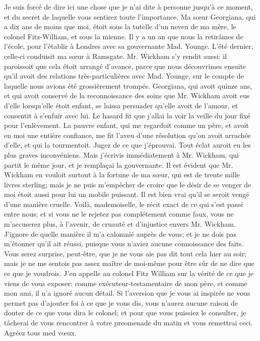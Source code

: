 Je suis forcé de dire ici une chose que je n'ai dite à personne jusqu'à ce moment,\setcounter{page}{97} et du secret de laquelle vous sentirez toute l'importance. Ma sœur Georgiana, qui a dix ans de moins que moi, étoit sous la tutelle d'un neveu de ma mère, le colonel Fitz-William, et sous la mienne. Il y a un an que nous la retirâmes de l'école, pour l'établir à Londres avec sa gouvernante Mad. Younge. L'été dernier, celle-ci conduisit ma sœur à Ramsgate. Mr. Wickham s'y rendit aussi: il paroissoit que cela étoit arrangé d'avance, parce que nous découvrimes ensuite qu'il avoit des relations très-particulières avec Mad. Younge, sur le compte de laquelle nous avions été grossièrement trompés. Georgiana, qui avoit quinze ans, et qui avoit conservé de la reconnoissance des soins que Mr. Wickham avoit eus d'elle lorsqu'elle étoit enfant, se laissa persuader qu'elle avoit de l'amour, et consentit à s'enfuir avec lui. Le hasard fit que j'allai la voir la veille du jour fixé pour l'enlèvement. La pauvre enfant, qui me regardoit comme un père, et avoit en moi une entière confiance, me fit l'aveu d'une résolution qu'on avoit arrachée d'elle, et qui la tourmentoit. Jugez de ce que j'éprouvai. Tout éclat auroit eu les plus graves inconvéniens. Mais j'écrivis immédiatement à Mr. Wickham, qui partit le même\setcounter{page}{98} jour, et je remplaçai la gouvernante. Il est évident que Mr. Wickham en vouloit surtout à la fortune de ma sœur, qui est de trente mille livres sterling; mais je ne puis m'empêcher de croire que le désir de se venger de moi étoit aussi pour lui un mobile puissant. Il est bien vrai qu'il se seroit vengé d'une manière cruelle.
Voilà, mademoiselle, le récit exact de ce qui s'est passé entre nous; et si vous ne le rejetez pas complétement comme faux, vous ne m'accuserez plus, à l'avenir, de cruauté et d'injustice envers Mr. Wickham. J'ignore de quelle manière il m'a calomnié auprès de vous; et je ne dois pas m'étonner qu'il ait réussi, puisque vous n'aviez aucune connoissance des faits. Vous serez surprise, peut-être, que je ne vous aie pas dit tout cela hier au soir; mais je ne me sentois pas assez maître de moi-même pour être sûr de ne dire que ce que je voudrois. J'en appelle au colonel Fitz William sur la vérité de ce que je viens de vous exposer: comme exécuteur-testamentaire de mon père, et comme mon ami, il n'a ignoré aucun détail. Si l'aversion que je vous ai inspirée ne vous permet pas d'ajouter foi à ce que je vous dis, vous n'aurez aucune raison de douter de ce que vous dira le colonel; et pour que vous\setcounter{page}{99} puissiez le consulter, je tâcherai de vous rencontrer à votre preomenade du matin et vous remettrai ceci. Agréez tous med vœux.
